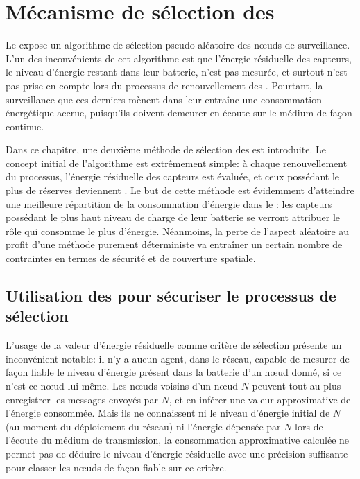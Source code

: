 \section{Mécanisme de sélection des \cns}\label{se:sec:proposal}

Le  expose un algorithme de sélection pseudo-aléatoire des nœuds de surveillance.
L'un des inconvénients de cet algorithme est que l'énergie résiduelle des capteurs, \cad le niveau d'énergie restant dans leur batterie, n'est pas mesurée, et surtout n'est pas prise en compte lors du processus de renouvellement des \cns.
Pourtant, la surveillance que ces derniers mènent dans leur \cluster entraîne une consommation énergétique accrue, puisqu'ils doivent demeurer en écoute sur le médium de façon continue.

Dans ce chapitre, une deuxième méthode de sélection des \cns est introduite.
Le concept initial de l'algorithme est extrêmement simple: à chaque renouvellement du processus, l'énergie résiduelle des capteurs est évaluée, et ceux possédant le plus de réserves deviennent \cns.
Le but de cette méthode est évidemment d'atteindre une meilleure répartition de la consommation d'énergie dans le \cluster: les capteurs possédant le plus haut niveau de charge de leur batterie se verront attribuer le rôle qui consomme le plus d'énergie.
Néanmoins, la perte de l'aspect aléatoire au profit d'une méthode purement déterministe va entraîner un certain nombre de contraintes en termes de sécurité et de couverture spatiale.

    \subsection{Utilisation des \vns pour sécuriser le processus de sélection}\label{se:subsubsec:elec1}

L'usage de la valeur d'énergie résiduelle comme critère de sélection présente un inconvénient notable: il n'y a aucun agent, dans le réseau, capable de mesurer de façon fiable le niveau d'énergie présent dans la batterie d'un nœud donné, si ce n'est ce nœud lui-même.
Les nœuds voisins d'un nœud $N$ peuvent tout au plus enregistrer les messages envoyés par $N$, et en inférer une valeur approximative de l'énergie consommée.
Mais ils ne connaissent ni le niveau d'énergie initial de $N$ (au moment du déploiement du réseau) ni l'énergie dépensée par $N$ lors de l'écoute du médium de transmission, la consommation approximative calculée ne permet pas de déduire le niveau d'énergie résiduelle avec une précision suffisante pour classer les nœuds de façon fiable sur ce critère.

